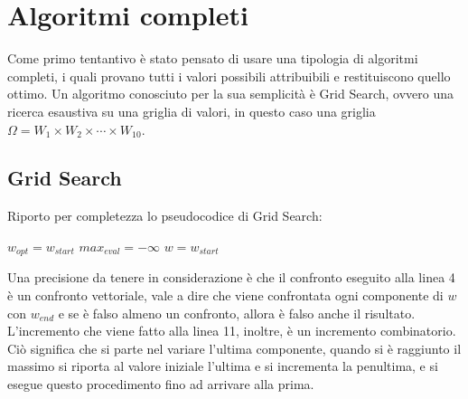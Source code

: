 \section{Algoritmi completi}
Come primo tentantivo è stato pensato di usare una tipologia di algoritmi completi,
i quali provano tutti i valori possibili attribuibili e restituiscono quello ottimo. Un algoritmo
conosciuto per la sua semplicità è Grid Search, ovvero una ricerca esaustiva
su una griglia di valori, in questo caso una griglia $\Omega = W_1 \times W_2 \times \cdots \times W_{10}$.

\subsection{Grid Search}

Riporto per completezza lo pseudocodice di Grid Search:

\begin{algorithm}[h]
	\small
	\DontPrintSemicolon
	\BlankLine
	$w_{opt} = w_{start}$\;
	$max_{eval} = -\infty$\;
	$w = w_{start}$\;
	\BlankLine
	\caption{\textsc{}}
	\label{alg:gs}
\end{algorithm}

Una precisione da tenere in considerazione è che il confronto
eseguito alla linea 4 è un confronto vettoriale, vale a dire che
viene confrontata ogni componente di $w$ con $w_{end}$ e se
è falso almeno un confronto, allora è falso anche il risultato.
L'incremento che viene fatto alla linea 11, inoltre, è un incremento
combinatorio. Ciò significa che si parte nel variare
l'ultima componente, quando si è raggiunto il massimo si
riporta al valore iniziale l'ultima e si incrementa la penultima,
e si esegue questo procedimento fino ad arrivare alla prima.

